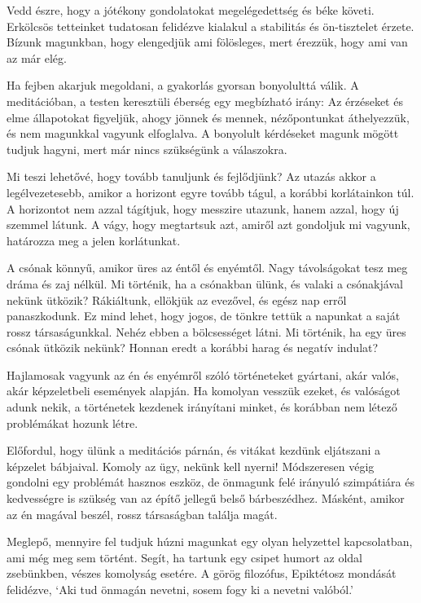 Vedd észre, hogy a jótékony gondolatokat megelégedettség és béke követi.
Erkölcsös tetteinket tudatosan felidézve kialakul a stabilitás és
ön-tisztelet érzete. Bízunk magunkban, hogy elengedjük ami fölösleges,
mert érezzük, hogy ami van az már elég.

Ha fejben akarjuk megoldani, a gyakorlás gyorsan bonyolulttá válik. A
meditációban, a testen keresztüli éberség egy megbízható irány: Az
érzéseket és elme állapotokat figyeljük, ahogy jönnek és mennek,
nézőpontunkat áthelyezzük, és nem magunkkal vagyunk elfoglalva. A
bonyolult kérdéseket magunk mögött tudjuk hagyni, mert már nincs
szükségünk a válaszokra.


Mi teszi lehetővé, hogy tovább tanuljunk és fejlődjünk? Az utazás akkor
a legélvezetesebb, amikor a horizont egyre tovább tágul, a korábbi
korlátainkon túl. A horizontot nem azzal tágítjuk, hogy messzire
utazunk, hanem azzal, hogy új szemmel látunk. A vágy, hogy megtartsuk
azt, amiről azt gondoljuk mi vagyunk, határozza meg a jelen korlátunkat.

A csónak könnyű, amikor üres az éntől és enyémtől. Nagy távolságokat
tesz meg dráma és zaj nélkül. Mi történik, ha a csónakban ülünk, és
valaki a csónakjával nekünk ütközik? Rákiáltunk, ellökjük az evezővel,
és egész nap erről panaszkodunk. Ez mind lehet, hogy jogos, de tönkre
tettük a napunkat a saját rossz társaságunkkal. Nehéz ebben a
bölcsességet látni. Mi történik, ha egy üres csónak ütközik nekünk?
Honnan eredt a korábbi harag és negatív indulat?

Hajlamosak vagyunk az én és enyémről szóló történeteket gyártani, akár
valós, akár képzeletbeli események alapján. Ha komolyan vesszük ezeket,
és valóságot adunk nekik, a történetek kezdenek irányítani minket, és
korábban nem létező problémákat hozunk létre.

\enlargethispage*{\baselineskip}

Előfordul, hogy ülünk a meditációs párnán, és vitákat kezdünk eljátszani
a képzelet bábjaival. Komoly az ügy, nekünk kell nyerni! Módszeresen
végig gondolni egy problémát hasznos eszköz, de önmagunk felé irányuló
szimpátiára és kedvességre is szükség van az építő jellegű belső
bárbeszédhez. Másként, amikor az én magával beszél, rossz társaságban
találja magát.


Meglepő, mennyire fel tudjuk húzni magunkat egy olyan helyzettel
kapcsolatban, ami még meg sem történt. Segít, ha tartunk egy csipet
humort az oldal zsebünkben, vészes komolyság esetére. A görög filozófus,
Epiktétosz mondását felidézve, `Aki tud önmagán nevetni, sosem fogy ki a
nevetni valóból.'

